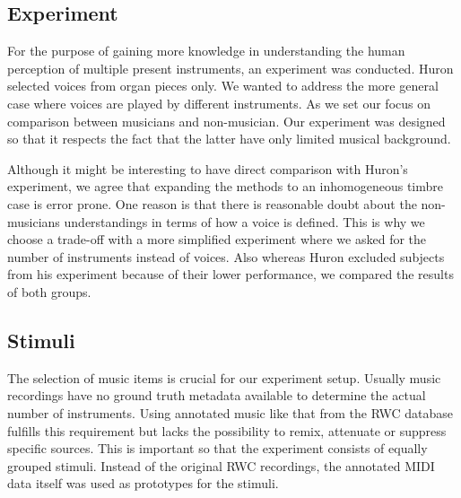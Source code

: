 \subsection{Experiment}
For the purpose of gaining more knowledge in understanding the human perception of multiple present instruments, an experiment was conducted. Huron selected voices from organ pieces only. We wanted to address the more general case where voices are played by different instruments.
As we set our focus on comparison between musicians and non-musician.
Our experiment was designed so that it respects the fact that the latter have only limited musical background.
\par
Although it might be interesting to have direct comparison with Huron's experiment, we agree that expanding the methods to an inhomogeneous timbre case is error prone. One reason is that there is reasonable doubt about the non-musicians understandings in terms of how a voice is defined. This is why we choose a trade-off with a more simplified experiment where we asked for the number of instruments instead of voices. Also whereas Huron \cite{huron89}  excluded subjects from his experiment because of their lower performance, we compared the results of both groups.

\subsection{Stimuli}

The selection of music items is crucial for our experiment setup. Usually music recordings have no ground truth metadata available to determine the actual number of instruments. Using annotated music like that from the RWC database~\cite{rwc} fulfills this requirement but lacks the possibility to remix, attenuate or suppress specific sources. This is important so that the experiment consists of equally grouped stimuli. Instead of the original RWC recordings, the annotated MIDI data itself was used as prototypes for the stimuli.

